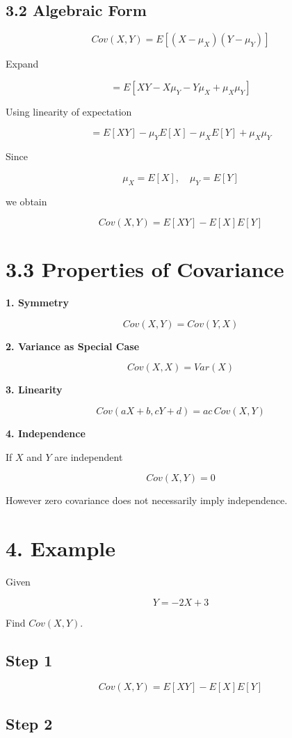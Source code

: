 \documentclass[12pt]{article}
\begin{document}
\subsection*{3.2 Algebraic Form}

\[
Cov(X,Y)=E[(X-\mu_X)(Y-\mu_Y)]
\]

Expand

\[
=E[XY-X\mu_Y-Y\mu_X+\mu_X\mu_Y]
\]

Using linearity of expectation

\[
=E[XY]-\mu_YE[X]-\mu_XE[Y]+\mu_X\mu_Y
\]

Since

\[
\mu_X=E[X], \quad \mu_Y=E[Y]
\]

we obtain

\[
Cov(X,Y)=E[XY]-E[X]E[Y]
\]

\section*{3.3 Properties of Covariance}

\textbf{1. Symmetry}

\[
Cov(X,Y)=Cov(Y,X)
\]

\textbf{2. Variance as Special Case}

\[
Cov(X,X)=Var(X)
\]

\textbf{3. Linearity}

\[
Cov(aX+b,cY+d)=ac \, Cov(X,Y)
\]

\textbf{4. Independence}

If $X$ and $Y$ are independent

\[
Cov(X,Y)=0
\]

However zero covariance does not necessarily imply independence.

\section*{4. Example}

Given

\[
Y=-2X+3
\]

Find $Cov(X,Y)$.

\subsection*{Step 1}

\[
Cov(X,Y)=E[XY]-E[X]E[Y]
\]

\subsection*{Step 2}
\end{document}
